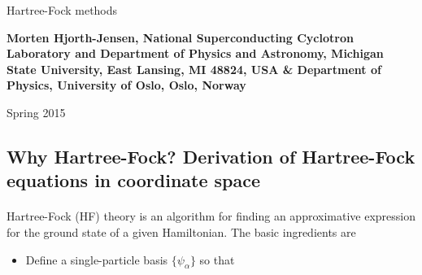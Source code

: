 \documentclass[%
twoside,                 %
final,                   %
10pt]{article}
\begin{document}




\thispagestyle{empty}

\begin{center}
{\LARGE\bf
\begin{spacing}{1.25}
Hartree-Fock methods
\end{spacing}
}
\end{center}


\begin{center}
{\bf Morten Hjorth-Jensen, National Superconducting Cyclotron Laboratory and Department of Physics and Astronomy, Michigan State University, East Lansing, MI 48824, USA {\&} Department of Physics, University of Oslo, Oslo, Norway${}^{}$} \\ [0mm]
\end{center}

    \begin{center}
\end{center}
    

\begin{center} %
Spring 2015
\end{center}

\vspace{1cm}


\subsection*{Why Hartree-Fock? Derivation of Hartree-Fock equations in coordinate space}

\paragraph{}
Hartree-Fock (HF) theory is an algorithm for finding an approximative expression for the ground state of a given Hamiltonian. The basic ingredients are
\begin{itemize}
  \item Define a single-particle basis $\{\psi_{\alpha}\}$ so that
\end{itemize}
\end{document}
